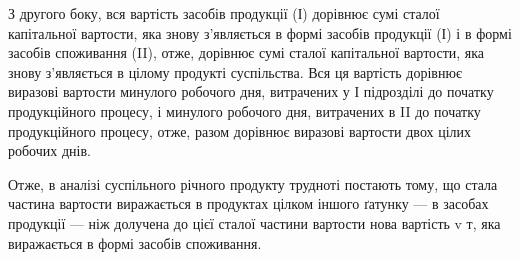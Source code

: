 З другого боку, вся вартість засобів продукції (І) дорівнює сумі сталої
капітальної вартости, яка знову з’являється в формі засобів продукції
(І) і в формі засобів споживання (II), отже, дорівнює сумі сталої
капітальної вартости, яка знову з’являється в цілому продукті суспільства.
Вся ця вартість дорівнює виразові вартости  минулого робочого дня,
витрачених у І підрозділі до початку продукційного процесу, і 
минулого робочого дня, витрачених в II до початку продукційного процесу,
отже, разом дорівнює виразові вартости двох цілих робочих днів.

Отже, в аналізі суспільного річного продукту трудноті постають тому,
що стала частина вартости виражається в продуктах цілком іншого ґатунку
— в засобах продукції — ніж долучена до цієї сталої частини
вартости нова вартість v \dplus{} т, яка виражається в формі засобів споживання.
\parbreak{}  %
